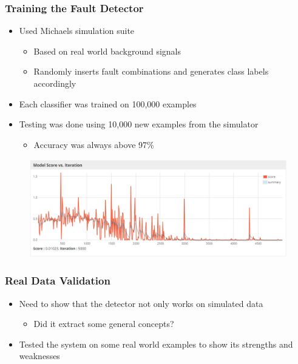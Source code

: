 \begin{frame}
  \frametitle{Training the Fault Detector}
  \begin{itemize}
    \item Used Michaels simulation suite
      \begin{itemize}
        \item Based on real world background signals
        \item Randomly inserts fault combinations and generates class labels
          accordingly
      \end{itemize}
    \item Each classifier was trained on 100,000 examples
    \item Testing was done using 10,000 new examples from the
      simulator
      \begin{itemize}
        \item Accuracy was always above 97\%
      \end{itemize}
  \end{itemize}
  \begin{figure}
    \includegraphics[width=.85\textwidth]{../figures/learning_curve}
  \end{figure}
\end{frame}

\begin{frame}
  \frametitle{Real Data Validation}
  \begin{itemize}
    \item Need to show that the detector not only works on simulated
      data
      \begin{itemize}
        \item Did it extract some general concepts?
      \end{itemize}
    \item Tested the system on some real world examples to show its
      strengths and weaknesses
  \end{itemize}
\end{frame}

